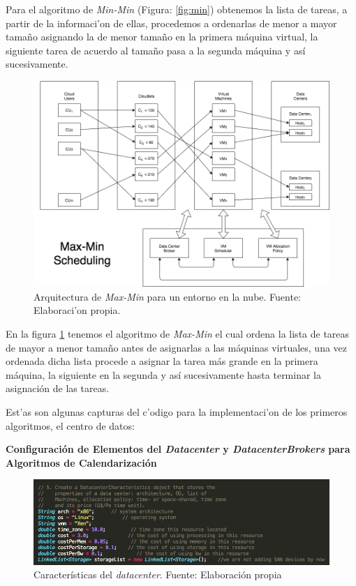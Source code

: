 Para el algoritmo de \textit{Min-Min} (Figura: \ref{fig:min}) obtenemos la lista de tareas, a partir de la informaci'on de ellas, procedemos a ordenarlas de menor a mayor tamaño asignando la de menor tamaño en la primera máquina virtual, la siguiente tarea de acuerdo al tamaño pasa a la segunda máquina y así sucesivamente.

\newpage
\renewcommand\thefigure{\arabic{figure}}
\begin{figure}[h!]
	\centering
	\includegraphics[scale=0.4]{media/imagencuatro}
	\caption{Arquitectura de \textit{Max-Min} para un entorno en la nube. Fuente: Elaboraci'on propia.}
	\label{fig:max}
\end{figure}

En la figura \ref{fig:max} tenemos el algoritmo de \textit{Max-Min} el cual ordena la lista de tareas de mayor a menor tamaño antes de asignarlas a las máquinas virtuales, una vez ordenada dicha lista procede a asignar la tarea más grande en la primera máquina, la siguiente en la segunda y así sucesivamente hasta terminar la asignación de las tareas.

\newpage 



Est'as son algunas capturas del c'odigo para la implementaci'on de los primeros algoritmos, el centro de datos:

\textbf{Configuración de Elementos del \textit{Datacenter} y \textit{DatacenterBrokers} para Algoritmos de Calendarización}

\renewcommand\thefigure{\arabic{figure}}
\begin{figure}[h!]
	\centering
	\includegraphics[scale=0.4]{media/caracteristicas_datacenter}
	\caption{Características del \textit{datacenter}. Fuente: Elaboración propia}
	\label{fig:DCar}
\end{figure}

